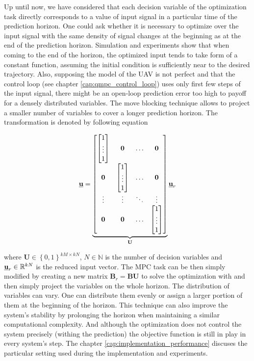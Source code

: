 Up until now, we have considered that each decision variable of the optimization task directly corresponds to a value of input signal in a particular time of the prediction horizon. One could ask whether it is necessary to optimize over the input signal with the same density of signal changes at the beginning as at the end of the prediction horizon. Simulation and experiments show that when coming to the end of the horizon, the optimized input tends to take form of a constant function, assuming the initial condition is sufficiently near to the desired trajectory. Also, supposing the model of the UAV is not perfect and that the control loop (see chapter \ref{cap:qmpc_control_loop}) uses only first few steps of the input signal, there might be an open-loop prediction error too high to payoff for a densely distributed variables. The move blocking technique allows to project a smaller number of variables to cover a longer prediction horizon. The transformation is denoted by following equation

\begin{equation}
\textbf{\underline{u}} = \underbrace{\begin{bmatrix}
\begin{bmatrix}
1\\
\vdots\\
1
\end{bmatrix} & \textbf{0} & \hdots & \textbf{0} \\
\textbf{0} & \begin{bmatrix}
1\\
\vdots\\
1
\end{bmatrix} & \hdots & \textbf{0}\\
\vdots & \vdots & \ddots & \vdots \\
\textbf{0} & \textbf{0} & \hdots & \begin{bmatrix}
1\\
\vdots\\
1
\end{bmatrix}
\end{bmatrix}}_{\textbf{U}}\textbf{\underline{u}}_{r}
\label{eq:moveblocking_example}
\end{equation}

where $\textbf{U} \in \left\lbrace 0, 1 \right\rbrace ^{kM \times kN}$, $N \in \mathbb{N}$ is the number of decision variables and $\textbf{\underline{u}}_{r} \in \mathbb{R}^{kN}$ is the reduced input vector. The MPC task can be then simply modified by creating a new matrix $\textbf{\^B}_{r} = \textbf{\^B}\textbf{U}$ to solve the optimization with and then simply project the variables on the whole horizon. The distribution of variables can vary. One can distribute them evenly or assign a larger portion of them at the beginning of the horizon. This technique can also improve the system's stability by prolonging the horizon when maintaining a similar computational complexity. And although the optimization does not control the system precisely (withing the prediction) the objective function is still in play in every system's step. The chapter \ref{cap:implementation_performance} discuses the particular setting used during the implementation and experiments.

